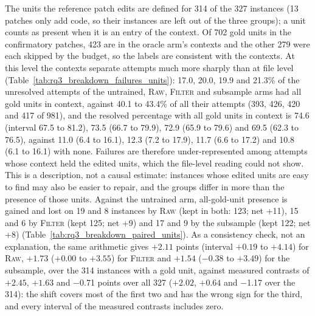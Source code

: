\documentclass[10pt,twocolumn]{article}
\makeatletter
\renewcommand\paragraph{\@startsection{paragraph}{4}{\z@}{3pt}{-0.5em}{\normalfont\bfseries}}
\makeatother
\begin{document}
\paragraph{Unit level (extra reading).} The units the reference patch edits are defined for 314 of the 327 instances (13 patches only add code, so their instances are left out of the three groups); a unit counts as present when it is an entry of the context. %
Of 702 gold units in the confirmatory patches, 423 are in the oracle arm's contexts and the other 279 were each skipped by the budget, so the labels are consistent with the contexts. %
At this level the contexts separate attempts much more sharply than at file level (Table~\ref{tab:rq3_breakdown_failures_units}): 17.0, 20.0, 19.9 and 21.3\% of the unresolved attempts of the untrained, \textsc{Raw}, \textsc{Filter} and subsample arms had all gold units in context, against 40.1 to 43.4\% of all their attempts (393, 426, 420 and 417 of 981), and the resolved percentage with all gold units in context is 74.6 (interval 67.5 to 81.2), 73.5 (66.7 to 79.9), 72.9 (65.9 to 79.6) and 69.5 (62.3 to 76.5), against 11.0 (6.4 to 16.1), 12.3 (7.2 to 17.9), 11.7 (6.6 to 17.2) and 10.8 (6.1 to 16.1) with none. %
Failures are therefore under-represented among attempts whose context held the edited units, which the file-level reading could not show. This is a description, not a causal estimate: instances whose edited units are easy to find may also be easier to repair, and the groups differ in more than the presence of those units.
Against the untrained arm, all-gold-unit presence is gained and lost on 19 and 8 instances by \textsc{Raw} (kept in both: 123; net +11), 15 and 6 by \textsc{Filter} (kept 125; net +9) and 17 and 9 by the subsample (kept 122; net +8) (Table~\ref{tab:rq3_breakdown_paired_units}). %
As a consistency check, not an explanation, the same arithmetic gives $+2.11$ points (interval $+0.19$ to $+4.14$) for \textsc{Raw}, $+1.73$ ($+0.00$ to $+3.55$) for \textsc{Filter} and $+1.54$ ($-$0.38 to $+3.49$) for the subsample, over the 314 instances with a gold unit, against measured contrasts of $+2.45$, $+1.63$ and $-$0.71 points over all 327 ($+2.02$, $+0.64$ and $-$1.17 over the 314): the shift covers most of the first two and has the wrong sign for the third, and every interval of the measured contrasts includes zero. %
\end{document}
